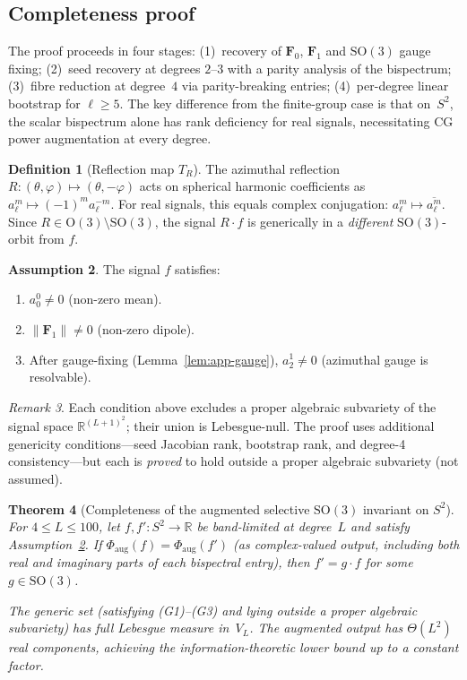 \documentclass{article}
\newtheorem{theorem}{Theorem}
\theoremstyle{definition}
\newtheorem{definition}[theorem]{Definition}
\theoremstyle{remark}
\newtheorem{remark}[theorem]{Remark}
\newcommand{\R}{\mathbb{R}}
\newcommand{\SO}{\mathrm{SO}}
\newcommand{\OG}{\mathrm{O}}
\newcommand{\norm}[1]{\lVert #1 \rVert}
\newcommand{\conj}[1]{\overline{#1}}
\theoremstyle{definition}
\newtheorem{assumption}[theorem]{Assumption}
\begin{document}
\subsection{Completeness proof}

The proof proceeds in four stages: (1)~recovery of $\mathbf{F}_0$,
$\mathbf{F}_1$ and $\SO(3)$ gauge fixing; (2)~seed recovery at degrees
$2$--$3$ with a parity analysis of the bispectrum; (3)~fibre reduction
at degree~$4$ via parity-breaking entries; (4)~per-degree linear
bootstrap for $\ell \ge 5$.
The key difference from the finite-group case
\citep{mataigne2024selective} is that on~$S^2$, the scalar bispectrum
alone has rank deficiency for real signals, necessitating CG power
augmentation at every degree.

\begin{definition}[Reflection map $T_R$]\label{def:app-TR}
The azimuthal reflection $R: (\theta,\varphi) \mapsto (\theta,-\varphi)$
acts on spherical harmonic coefficients as
$a_\ell^m \mapsto (-1)^m a_\ell^{-m}$.
For real signals, this equals complex conjugation: $a_\ell^m \mapsto \conj{a_\ell^m}$.
Since $R \in \OG(3) \setminus \SO(3)$, the signal $R \cdot f$ is generically
in a \emph{different} $\SO(3)$-orbit from $f$.
\end{definition}

\begin{assumption}\label{ass:app-generic}
The signal $f$ satisfies:
\begin{enumerate}[label=(G\arabic*),nosep]
  \item $a_0^0 \ne 0$ (non-zero mean).
  \item $\norm{\mathbf{F}_1} \ne 0$ (non-zero dipole).
  \item After gauge-fixing (Lemma~\ref{lem:app-gauge}), $a_2^1 \ne 0$
    (azimuthal gauge is resolvable).
\end{enumerate}
\end{assumption}

\begin{remark}
Each condition above excludes a proper algebraic subvariety of the signal
space $\R^{(L+1)^2}$; their union is Lebesgue-null.
The proof uses additional genericity conditions---seed Jacobian rank,
bootstrap rank, and degree-4 consistency---but each is \emph{proved}
to hold outside a proper algebraic subvariety (not assumed).
\end{remark}

\begin{theorem}[Completeness of the augmented selective $\SO(3)$ invariant on $S^2$]
\label{thm:app-main}
For $4 \le L \le 100$, let $f, f' : S^2 \to \R$ be band-limited at degree~$L$
and satisfy Assumption~\ref{ass:app-generic}. If
$\Phi_{\mathrm{aug}}(f) = \Phi_{\mathrm{aug}}(f')$
(as complex-valued output, including both real and imaginary parts
of each bispectral entry), then $f' = g \cdot f$ for some $g \in \SO(3)$.

The generic set (satisfying (G1)--(G3) and lying outside a proper
algebraic subvariety) has full Lebesgue measure in~$V_L$.
The augmented output has $\Theta(L^2)$ real components, achieving the
information-theoretic lower bound up to a constant factor.
\end{theorem}
\end{document}
